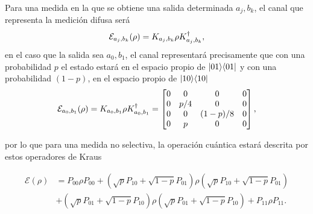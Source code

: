 Para una medida en la que se obtiene una salida determinada $a_j,b_k$, el canal que representa la medición difusa será \[\mathcal{E}_{a_j,b_k}(\rho)=K_{a_j,b_k}\rho K_{a_j,b_k}^\dagger,\]
en el caso que la salida sea $a_0,b_1$, el canal representará precisamente que con una probabilidad $p$ el estado estará en el espacio propio de $|01\rangle \langle 01|$ y con una probabilidad $(1-p)$, en el espacio propio de $|10\rangle \langle10|$
\[\mathcal{E}_{a_0,b_1}(\rho)=K_{a_0,b_1}\rho K_{a_0,b_1}^\dagger=\begin{bmatrix}
    0&0&0&0\\
    0&p/4&0&0\\
    0&0&(1-p)/8&0\\
    0&p&0&0\\
\end{bmatrix},\]



por lo que para una medida no selectiva, la operación cuántica estará descrita por estos operadores de Kraus

\[
\begin{split}
    \mathcal{E}(\rho)&=  P_{00}\rho P_{00}+(\sqrt{p}P_{10}+\sqrt{1-p}P_{01})\rho(\sqrt{p}P_{10}+\sqrt{1-p}P_{01})\\
    &+ (\sqrt{p}P_{01}+\sqrt{1-p}P_{10})\rho (\sqrt{p} P_{01}+\sqrt{1-p}P_{10})+P_{11}\rho P_{11}.\\
\end{split}
\]


